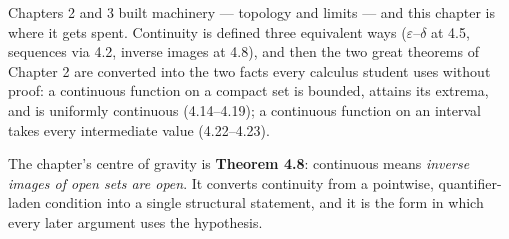 
\begin{roadmap}
Chapters 2 and 3 built machinery --- topology and limits --- and this chapter
is where it gets spent. Continuity is defined three equivalent ways
($\varepsilon$--$\delta$ at 4.5, sequences via 4.2, inverse images at 4.8),
and then the two great theorems of Chapter 2 are converted into the two
facts every calculus student uses without proof: a continuous function on a
compact set is bounded, attains its extrema, and is uniformly continuous
(4.14--4.19); a continuous function on an interval takes every intermediate
value (4.22--4.23).

\medskip
The chapter's centre of gravity is \textbf{Theorem 4.8}: continuous means
\emph{inverse images of open sets are open}. It converts continuity from a
pointwise, quantifier-laden condition into a single structural statement, and
it is the form in which every later argument uses the hypothesis.
\end{roadmap}

